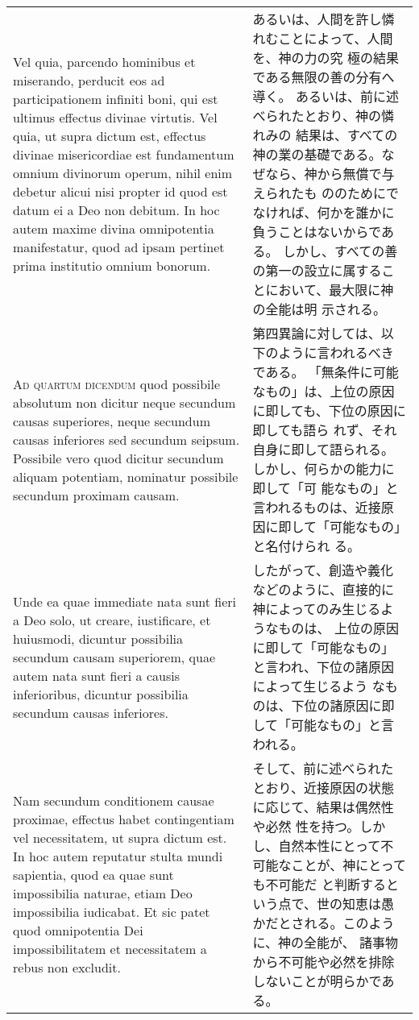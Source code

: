 \documentclass[10pt]{jsarticle} %
\begin{document}
\begin{longtable}{p{21em}p{21em}}
\\

Vel quia,
parcendo hominibus et miserando, perducit eos ad participationem
infiniti boni, qui est ultimus effectus divinae virtutis. Vel quia, ut
supra dictum est, effectus divinae misericordiae est fundamentum omnium
divinorum operum, nihil enim debetur alicui nisi propter id quod est
datum ei a Deo non debitum. In hoc autem maxime divina omnipotentia
manifestatur, quod ad ipsam pertinet prima institutio omnium bonorum.

&

あるいは、人間を許し憐れむことによって、人間を、神の力の究
 極の結果である無限の善の分有へ導く。
あるいは、前に述べられたとおり、神の憐れみの
 結果は、すべての神の業の基礎である。なぜなら、神から無償で与えられたも
 ののためにでなければ、何かを誰かに負うことはないからである。
しかし、すべての善の第一の設立に属することにおいて、最大限に神の全能は明
 示される。

\\



{\scshape Ad quartum dicendum} quod possibile absolutum
non dicitur neque secundum causas superiores, neque secundum causas
inferiores sed secundum seipsum. Possibile vero quod dicitur secundum
aliquam potentiam, nominatur possibile secundum proximam causam. 


&

第四異論に対しては、以下のように言われるべきである。
「無条件に可能なもの」は、上位の原因に即しても、下位の原因に即しても語ら
 れず、それ自身に即して語られる。しかし、何らかの能力に即して「可
 能なもの」と言われるものは、近接原因に即して「可能なもの」と名付けられ
 る。


\\


Unde ea
quae immediate nata sunt fieri a Deo solo, ut creare, iustificare, et
huiusmodi, dicuntur possibilia secundum causam superiorem, quae autem
nata sunt fieri a causis inferioribus, dicuntur possibilia secundum
causas inferiores. 



&

したがって、創造や義化
などのように、直接的に神によってのみ生じるようなものは、
上位の原因に即して「可能なもの」と言われ、下位の諸原因によって生じるよう
 なものは、下位の諸原因に即して「可能なもの」と言われる。

\\


Nam secundum conditionem causae proximae, effectus
habet contingentiam vel necessitatem, ut supra dictum est. In hoc autem
reputatur stulta mundi sapientia, quod ea quae sunt impossibilia
naturae, etiam Deo impossibilia iudicabat. Et sic patet quod
omnipotentia Dei impossibilitatem et necessitatem a rebus non excludit.


&

そして、前に述べられたとおり、近接原因の状態に応じて、結果は偶然性や必然
 性を持つ。しかし、自然本性にとって不可能なことが、神にとっても不可能だ
 と判断するという点で、世の知恵は愚かだとされる。このように、神の全能が、
 諸事物から不可能や必然を排除しないことが明らかである。


\end{longtable}
\end{document}
